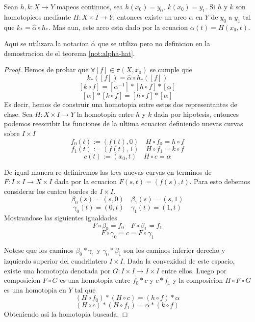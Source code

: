\begin{lema} \label{lem:equiv-hom-lift}
  Sean \(h,k : X \to Y\) mapeos continuos, sea \(h (x_0) = y_0,\ k(x_0)
  = y_1\). Si \(h\) y \(k\) son homotopicos mediante \(H : X \times I
  \to Y\), entonces existe un arco \(\alpha\) en \(Y\) de \(y_0\) a
  \(y_1\) tal que \(k_* = \hat \alpha \circ h_* \). Mas aun, este arco
  esta dado por la ecuacion \(\alpha (t) = H (x_0, t)\).
\end{lema}
\noindent Aqui se utilizara la notacion \(\hat \alpha\) que se utilizo
pero no definicion en la demostracion de el teorema \ref{not:alpha-hat}.
\begin{proof}
  Hemos de probar que \(\forall [f] \in \pi (X, x_0)\) se cumple que
  \[ k_* ([f]) = \hat \alpha \circ h_* ([f]) \]
  \[ [k \circ f] = [ \alpha^{-1} ] *  [h \circ f] * [\alpha] \]
  \[ [ \alpha ] * [k \circ f] =  [h \circ f] * [\alpha] \]
  Es decir, hemos de construir una homotopia entre estos dos
  representantes de clase. Sea \(H : X \times I \to Y\) la homotopia
  entre \(h\) y \(k\) dada por hipotesis, entonces podemos reescribir
  las funciones de la ultima ecuacion definiendo nuevas curvas sobre \(I
  \times I\)
  \[ f_0(t) := (f(t), 0) \quad H \circ f_0 = h \circ f \]
  \[ f_1(t) := (f(t), 1) \quad H \circ f_1 = k \circ f \]
  \[ c(t) := (x_0, t) \quad H \circ c = \alpha \]

  De igual manera re-definiremos las tres nuevas curvas en terminos de
  \(F : I \times I \to X \times I\) dada por la ecuacion \(F(s,t) =
  (f(s),t)\). Para esto debemos considerar los cuatro bordes de
  \(I \times I\).
  \[ \beta_0(s) = (s, 0) \quad \beta_1(s) = (s, 1)\]
  \[ \gamma_0(t) = (0, t) \quad \gamma_1(t) = (1, t)\]
  Mostrandose las siguientes igualdades
  \[ F \circ \beta_0 = f_0 \quad F \circ \beta_1 = f_1\]
  \[ F \circ \gamma_0 = c = F \circ \gamma_1 \]

  Notese que los caminos \(\beta_0 * \gamma_1\) y \(\gamma_0 * \beta_1\)
  son los caminos inferior derecho y izquierdo superior del cuadrilatero
  \(I \times I\). Dada la convexidad de este espacio, existe una
  homotopia denotada por \(G : I \times I \to I \times I \) entre ellos.
  Luego por composicion \(F \circ G\) es una homotopia entre \(f_0 * c\) y
  \(c * f_1\) y la composicion \(H \circ F \circ G\) es una homotopia en
  \(Y\) tal que
  \[ (H \circ f_0) * (H \circ c) = (h \circ f) * \alpha \]
  \[ (H \circ c) * (H \circ f_1) = \alpha * (k \circ f) \]
  Obteniendo asi la homotopia buscada.
\end{proof}

